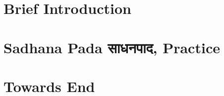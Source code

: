\section[Intro]{Brief Introduction}


\section[Sadhanapad]{Sadhana Pada साधनपाद, Practice}


\section[End]{Towards End}

